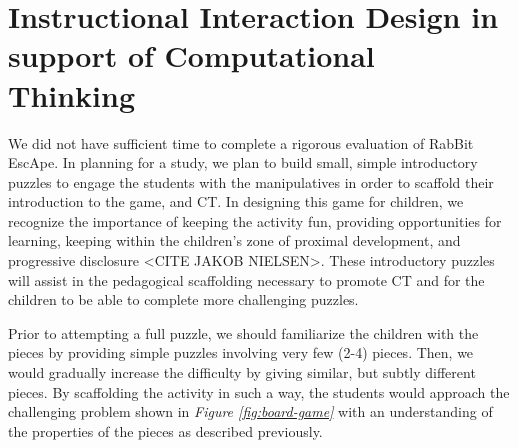 \documentclass{acm_proc_article-sp}
\begin{document}
\section{Instructional Interaction Design in support of Computational Thinking}
We did not have sufficient time to complete a rigorous evaluation of RabBit EscApe. 
In planning for a study, we plan to build small, simple introductory puzzles to engage the students with the manipulatives in order to scaffold their introduction to the game, and CT.
In designing this game for children, we recognize the importance of keeping the activity fun, providing opportunities for learning, keeping within the children's zone of proximal development\cite{vygotsky1987zone}, and progressive disclosure <CITE JAKOB NIELSEN>.
These introductory puzzles will assist in the pedagogical scaffolding necessary to promote CT and for the children to be able to complete more challenging puzzles.

Prior to attempting a full puzzle, we should familiarize the children with the pieces by providing simple puzzles involving very few (2-4) pieces. 
Then, we would gradually increase the difficulty by giving similar, but subtly different pieces. 
By scaffolding the activity in such a way, the students would approach the challenging problem shown in {\em Figure \ref{fig:board-game}} with an understanding of the properties of the pieces as described previously.
\end{document}
